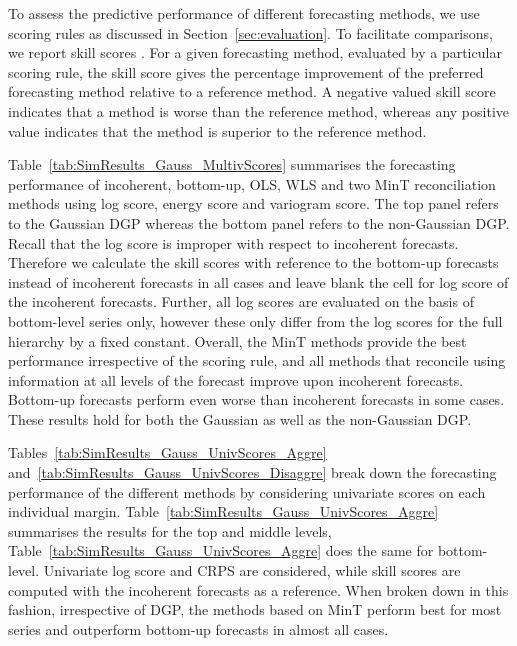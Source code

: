 \documentclass[12pt]{article}
\theoremstyle{definition}
\begin{document}
To assess the predictive performance of different forecasting methods, we use scoring rules as discussed in Section~\ref{sec:evaluation}. To facilitate comparisons, we report skill scores \citep{Gneiting2007}. For a given forecasting method, evaluated by a particular scoring rule, the skill score
gives the percentage improvement of the preferred forecasting method relative to a reference method. A negative valued skill score indicates that a method is worse than the reference method, whereas any positive value indicates that the method is superior to the reference method.

Table~\ref{tab:SimResults_Gauss_MultivScores} summarises the forecasting performance of incoherent, bottom-up, OLS, WLS and two MinT reconciliation methods using log score, energy score and variogram score. The top panel refers to the Gaussian DGP whereas the bottom panel refers to the non-Gaussian DGP. Recall that the log score is improper with respect to incoherent forecasts. Therefore we calculate the skill scores with reference to the bottom-up forecasts instead of incoherent forecasts in all cases and leave blank the cell for log score of the incoherent forecasts. Further, all log scores are evaluated on the basis of bottom-level series only, however these only differ from the log scores for the full hierarchy by a fixed constant. Overall, the MinT methods provide the best performance irrespective of the scoring rule, and all methods that reconcile using information at all levels of the forecast improve upon incoherent forecasts. Bottom-up forecasts perform even worse than incoherent forecasts in some cases. These results hold for both the Gaussian as well as the non-Gaussian DGP.

Tables~\ref{tab:SimResults_Gauss_UnivScores_Aggre} and~\ref{tab:SimResults_Gauss_UnivScores_Disaggre} break down the forecasting performance of the different methods by considering univariate scores on each individual margin. Table~\ref{tab:SimResults_Gauss_UnivScores_Aggre} summarises the results for the top and middle levels, Table~\ref{tab:SimResults_Gauss_UnivScores_Aggre} does the same for bottom-level. Univariate log score and CRPS are considered, while skill scores are computed with the incoherent forecasts as a reference. When broken down in this fashion, irrespective of DGP, the methods based on MinT perform best for most series and outperform bottom-up forecasts in almost all cases.
\end{document}
